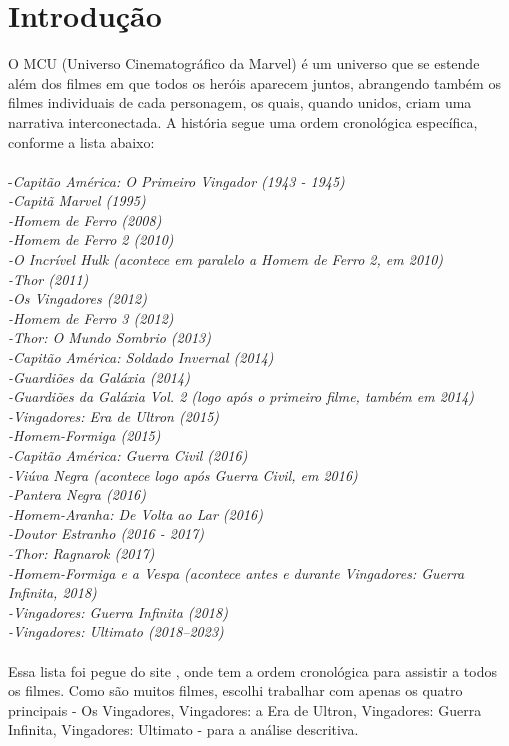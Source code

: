 \documentclass[
    12pt,                  %
    openright,             %
    oneside,               %
    a4paper,               %
    chapter=TITLE,         %
    section=TITLE,         %
    brazil                 %
]{abntex2}                 %
\begin{document}
\section{Introdução}
O MCU (Universo Cinematográfico da Marvel) é um universo que se estende além dos filmes em que todos os heróis aparecem juntos, abrangendo também os filmes individuais de cada personagem, os quais, quando unidos, criam uma narrativa interconectada. A história segue uma ordem cronológica específica, conforme a lista abaixo:\\
\vspace{0.05cm}\\
-\textit{Capitão América: O Primeiro Vingador (1943 - 1945)\\
-Capitã Marvel (1995)\\
-Homem de Ferro (2008)\\
-Homem de Ferro 2 (2010)\\
-O Incrível Hulk (acontece em paralelo a Homem de Ferro 2, em 2010)\\
-Thor (2011)\\
-Os Vingadores (2012)\\
-Homem de Ferro 3 (2012)\\
-Thor: O Mundo Sombrio (2013)\\
-Capitão América: Soldado Invernal (2014)\\
-Guardiões da Galáxia (2014)\\
-Guardiões da Galáxia Vol. 2 (logo após o primeiro filme, também em 2014)\\
-Vingadores: Era de Ultron (2015)\\
-Homem-Formiga (2015)\\
-Capitão América: Guerra Civil (2016)\\
-Viúva Negra (acontece logo após Guerra Civil, em 2016)\\
-Pantera Negra (2016)\\
-Homem-Aranha: De Volta ao Lar (2016)\\
-Doutor Estranho (2016 - 2017)\\
-Thor: Ragnarok (2017)\\
-Homem-Formiga e a Vespa (acontece antes e durante Vingadores: Guerra Infinita, 2018)\\
-Vingadores: Guerra Infinita (2018)\\
-Vingadores: Ultimato (2018–2023)\\}
\vspace{0.05cm}\\
Essa lista foi pegue do site \cite{marvel2024}, onde tem a ordem cronológica para assistir a todos os filmes. Como são muitos filmes, escolhi trabalhar com apenas os quatro principais - Os Vingadores, Vingadores: a Era de Ultron, Vingadores: Guerra Infinita, Vingadores: Ultimato - para a análise descritiva.
\newpage
\end{document}
